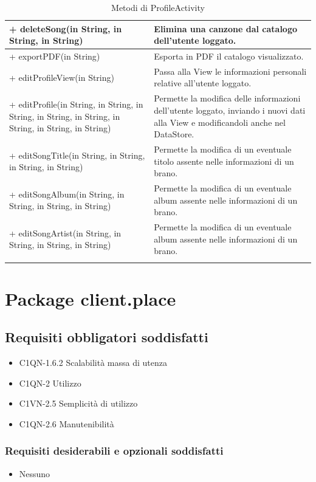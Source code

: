 \begin{longtable}{|p{}|p{}|}
+ deleteSong(in String, in String, in String) & Elimina una canzone dal
catalogo dell'utente loggato.\\\hline
+ exportPDF(in String) & Esporta in PDF il catalogo visualizzato.\\\hline
+ editProfileView(in String) &  Passa alla View le informazioni personali
relative all'utente loggato.\\\hline
+ editProfile(in String, in String, in String, in String, in String, in String,
in String, in String) & Permette la modifica delle informazioni
dell'utente loggato, inviando i nuovi dati alla View e modificandoli
anche nel DataStore.\\\hline
+ editSongTitle(in String, in String, in String, in String) & Permette
la modifica di un eventuale titolo assente nelle informazioni di un
brano.\\\hline + editSongAlbum(in String, in String, in String, in String) &
Permette la modifica di un eventuale album assente nelle informazioni di un
brano.\\\hline
+ editSongArtist(in String, in String, in String, in String) & Permette
la modifica di un eventuale album assente nelle informazioni di un
brano.\\\hline
\caption{Metodi di ProfileActivity}
\end{longtable}


\newpage
\section{Package client.place} %
\subsection*{Requisiti obbligatori soddisfatti}
\begin{itemize}
	\item C1QN-1.6.2 Scalabilit\`a massa di utenza
	\item C1QN-2 Utilizzo
	\item C1VN-2.5 Semplicit\`a di utilizzo
	\item C1QN-2.6 Manutenibilit\`a
\end{itemize}
\subsubsection*{Requisiti desiderabili e opzionali soddisfatti}
\begin{itemize}
    \item Nessuno
\end{itemize}

